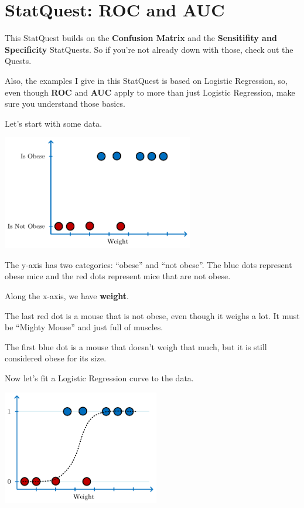 \documentclass[
	final,
	a4paper,
	oneside,
	parskip=full,
	headings=standardclasses,
	headings=big,
	pointednumbers
]{scrartcl}
\newcommand{\txb}[1]{{\color{blue}#1}}
\newcommand{\txr}[1]{{\color{red}#1}}
\newcommand{\tb}[1]{\textbf{#1}}
\begin{document}
    \section*{StatQuest: ROC and AUC}

    This StatQuest builds on the \tb{Confusion Matrix} and the \tb{Sensitifity and Specificity}
    StatQuests. So if you're not already down with those, check out the Quests.

    Also, the examples I give in this StatQuest is based on Logistic Regression, so, even though
    \tb{ROC} and \tb{AUC} apply to more than just Logistic Regression, make sure you
    understand those basics.

    Let's start with some data.

    \begin{center}
        \includegraphics[height=5cm]{StatQuest_ROC_and_AUC_Obese.pdf}
    \end{center}

    The y-axis has two categories: ``obese'' and ``not obese''.
    The \txb{blue dots} represent obese mice and the \txr{red dots} represent mice that are not obese.

    Along the x-axis, we have \tb{weight}.

    The last red dot is a mouse that is not obese,
    even though it weighs a lot. It must be ``Mighty Mouse'' and just full of muscles.

    The first blue dot is a mouse that doesn't weigh that much, but it is still considered
    obese for its size.

    Now let's fit a Logistic Regression curve to the data.

    \begin{center}
        \includegraphics[height=5cm]{StatQuest_ROC_and_AUC_Obese_Probability.pdf}
    \end{center}
\end{document}
